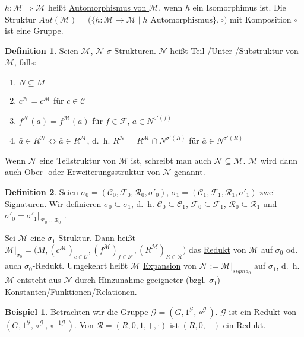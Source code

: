 \documentclass{article}
\theoremstyle{definition}
\newtheorem{dfn}{Definition}
\newtheorem*{exm}{Beispiel}
\newcommand{\calC}{\mathcal{C}}
\newcommand{\calF}{\mathcal{F}}
\newcommand{\calG}{\mathcal{G}}
\newcommand{\calM}{\mathcal{M}}
\newcommand{\calN}{\mathcal{N}}
\newcommand{\calR}{\mathcal{R}}
\newcommand{\sign}[1]{(\calC_{#1}, \calF_{#1}, \calR_{#1}, \sigma'_{#1})}
\newcommand{\struc}[3]{\big(#1, (c^{#2})_{c \in \calC_{#3}}, (f^{#2})_{f \in \calF_{#3}}, (R^{#2})_{R \in \calR_{#3}}\big)}
\begin{document}
    $ h : \calM \Rightarrow \calM $ heißt \underline{Automorphismus von $ \calM $}, wenn $ h $ ein Isomorphimus ist.
    Die Struktur $ Aut(\calM) = \big( \{ h : \calM \rightarrow \calM \mid h \text{ Automorphismus} \}, \circ \big) $ mit Komposition $ \circ $ ist eine Gruppe.

    \begin{dfn}
        Seien $ \calM $, $ \calN $ $\sigma $-Strukturen.
        $ \calN $ heißt \underline{Teil-/Unter-/Substruktur} von $ \calM $, falls:
        \begin{enumerate}
            \item $ N \subseteq M $
            \item $ c^\calN = c^\calM $ für $ c \in \calC $
            \item $ f^\calN(\bar{a}) = f^\calM(\bar{a}) $ für $ f \in \calF $, $ \bar{a} \in N^{\sigma'(f)} $
            \item $ \bar{a} \in R^\calN \Leftrightarrow \bar{a} \in R^\calM $, d.~h. $ R^\calN = R^\calM \cap N^{\sigma'(R)} $ für $ \bar{a} \in N^{\sigma'(R)} $
        \end{enumerate}
    \end{dfn}

    Wenn $ \calN $ eine Teilstruktur von $ \calM $ ist, schreibt man auch $ \calN \subseteq \calM $.
    $ \calM $ wird dann auch \underline{Ober- oder Erweiterungsstruktur von $ \calN $} genannt.

    \begin{dfn}
        Seien $ \sigma_0 = \sign{0} $, $ \sigma_1 = \sign{1} $ zwei Signaturen.
        Wir definieren $ \sigma_0 \subseteq \sigma_1 $, d.~h. $ \calC_0 \subseteq \calC_1 $, $ \calF_0 \subseteq \calF_1 $, $ \calR_0 \subseteq \calR_1 $ und $ \sigma'_0 = \sigma'_1 \vert_{\calF_0 \cup \calR_0} $ .

        Sei $ \calM $ eine $ \sigma_1 $-Struktur.
        Dann heißt $ \calM \vert_{\sigma_0} = \struc{M}{\calM}{} $ das \underline{Redukt} von $ \calM $ auf $ \sigma_0 $ od. auch $ \sigma_0 $-Redukt.
        Umgekehrt heißt $ \calM $ \underline{Expansion} von $ \calN := \calM \vert_{sigma_0} $ auf $ \sigma_1 $, d.~h. $ \calM $ entsteht aus $ \calN $ durch Hinzunahme geeigneter (bzgl. $ \sigma_1 $) Konstanten/Funktionen/Relationen.
    \end{dfn}

    \begin{exm}
        Betrachten wir die Gruppe $ \calG = (G, 1^\calG, \circ^\calG) $.
        $ \calG $ ist ein Redukt von $ (G, 1^\calG, \circ^\calG, \circ^{-1\calG}) $.
        Von $ \calR = (R, 0, 1, +, \cdot) $ ist $ (R, 0, +) $ ein Redukt.
    \end{exm}
\end{document}
